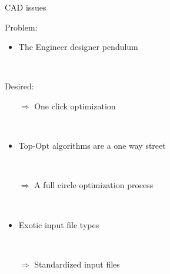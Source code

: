 
\begin{frame}{CAD issues}

	\begin{multicols}{2}
		\begin{block}{Problem:}{
		\begin{itemize}		
			\item The Engineer designer pendulum			
		\end{itemize}~\\
		}
		\end{block}
		
		
		
		\vfill
		\columnbreak


		\begin{block}{Desired:}{
		\begin{itemize}		
			\item[$\Rightarrow$] One click optimization				
		\end{itemize}~\\
		}
		\end{block}
				
		\end{multicols}
		\pause
		
	\begin{multicols}{2}

		\begin{itemize}
			\item Top-Opt algorithms are a one way street
		\end{itemize}~\\
		\vfill
		\columnbreak
		\begin{itemize}
			\item[$\Rightarrow$] A full circle optimization process	
		\end{itemize}~\\			
		\end{multicols}
		\pause
	\begin{multicols}{2}

		\begin{itemize}
			\item Exotic input file types
		\end{itemize}~\\
		\vfill
		\columnbreak
		\begin{itemize}
			\item[$\Rightarrow$] Standardized input files	
		\end{itemize}~\\			
		\end{multicols}

\end{frame}	


